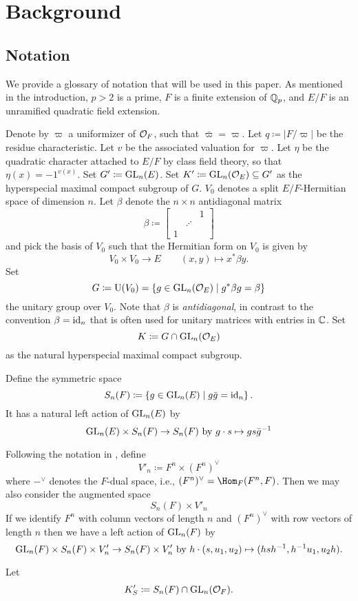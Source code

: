 \section{Background}
\label{sec:background}

\subsection{Notation}
We provide a glossary of notation that will be used in this paper.
As mentioned in the introduction, $p > 2$ is a prime,
$F$ is a finite extension of $\mathbb Q_p$,
and $E/F$ is an unramified quadratic field extension.

\begin{itemize}
  \ii Denote by $\varpi$ a uniformizer of $\mathcal O_F$, such that $\bar \varpi = \varpi$.
  \ii Let $q \coloneqq |F/\varpi|$ be the residue characteristic.
  \ii Let $v$ be the associated valuation for $\varpi$.
  \ii Let $\eta$ be the quadratic character attached to $E/F$ by class field theory,
  so that $\eta(x) = -1^{v(x)}$.
  \ii Set $G' \coloneqq \operatorname{GL}_n(E)$.
  \ii Set $K' \coloneqq \operatorname{GL}_n(\mathcal O_E) \subseteq G'$ as the hyperspecial maximal compact subgroup of $G$.
  \ii $V_0$ denotes a split $E/F$-Hermitian space of dimension $n$.
  \ii Let $\beta$ denote the $n \times n$ antidiagonal matrix
  \[ \beta \coloneqq \begin{bmatrix} && 1 \\ & \iddots \\ 1 \end{bmatrix} \]
  and pick the basis of $V_0$ such that the Hermitian form on $V_0$ is given by
  \[ V_0 \times V_0 \to E \qquad (x,y) \mapsto x^\ast \beta y. \]
  \ii Set
  \[ G \coloneqq \operatorname{U}(V_0) = \{ g \in \operatorname{GL}_n(\mathcal O_E) \mid g^\ast \beta g = \beta\} \]
  the unitary group over $V_0$.
  Note that $\beta$ is \emph{antidiagonal}, in contrast to the convention $\beta = \operatorname{id}_n$
  that is often used for unitary matrices with entries in $\mathbb C$.
  \ii Set
  \[ K \coloneqq G \cap \operatorname{GL}_n(\mathcal O_E) \]
  as the natural hyperspecial maximal compact subgroup.

  \ii Define the symmetric space
  \[ S_n(F) \coloneqq \left\{ g \in \operatorname{GL}_n(E) \mid g \bar g = \operatorname{id}_n \right\}. \]
  It has a natural left action of $\operatorname{GL}_n(E)$ by
  \[ \operatorname{GL}_n(E) \times S_n(F) \to S_n(F) \text { by } g \cdot s \mapsto g s \bar g^{-1} \]

  \ii Following the notation in \cite{ref:highdim2024}, define
  \[ V'_n \coloneqq F^n \times (F^n)^\vee \]
  where $-^\vee$ denotes the $F$-dual space, i.e., $(F^n)^\vee = \Hom_F(F^n, F)$.
  Then we may also consider the augmented space
  \[ S_n(F) \times V'_n \]
  If we identify $F^n$ with column vectors of length $n$ and $(F^n)^\vee$
  with row vectors of length $n$ then we have a left action of $\operatorname{GL}_n(F)$ by
  \[ \operatorname{GL}_n(F) \times S_n(F) \times V_n' \to S_n(F) \times V_n'
    \text { by } h \cdot (s, u_1, u_2) \mapsto (hsh^{-1}, h^{-1}u_1, u_2h). \]

  \ii Let \[ K'_S \coloneqq S_n(F) \cap \operatorname{GL}_n(\mathcal O_F). \]
\end{itemize}

